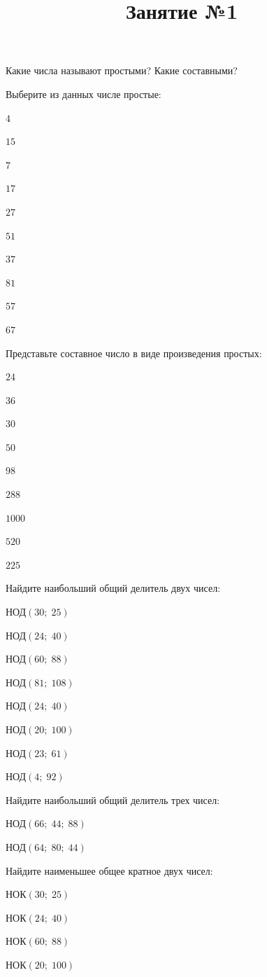 \title{Занятие №1}
\begin{listofex}
	\item Какие числа называют простыми? Какие составными?
	\item Выберите из данных числе простые:
	\begin{enumcols}[itemcolumns=10]
		\item \( 4 \)
		\item \( 15 \)
		\item \( 7 \)
		\item \( 17 \)
		\item \( 27 \)
		\item \( 51 \)
		\item \( 37 \)
		\item \( 81 \)
		\item \( 57 \)
		\item \( 67 \)
	\end{enumcols}
	\item Представьте составное число в виде произведения простых:
	\begin{enumcols}[itemcolumns=3]
		\item \( 24 \)
		\item \( 36 \)
		\item \( 30 \)
		\item \( 50 \)
		\item \( 98 \)
		\item \( 288 \)
		\item \( 1000 \)
		\item \( 520 \)
		\item \( 225 \)
	\end{enumcols}
	\item Найдите наибольший общий делитель двух чисел:
	\begin{enumcols}[itemcolumns=4]
		\item НОД\( (30;\;25) \)
		\item НОД\( (24;\;40) \)
		\item НОД\( (60;\;88) \)
		\item НОД\( (81;\;108) \)
		\item НОД\( (24;\;40) \)
		\item НОД\( (20;\;100) \)
		\item НОД\( (23;\;61) \)
		\item НОД\( (4;\;92) \)
	\end{enumcols}
	\item Найдите наибольший общий делитель трех чисел:
	\begin{enumcols}[itemcolumns=2]
		\item НОД\( (66;\;44;\;88) \)
		\item НОД\( (64;\;80;\;44) \)
	\end{enumcols}
	\item Найдите наименьшее общее кратное двух чисел:
	\begin{enumcols}[itemcolumns=4]
		\item НОК\( (30;\;25) \)
		\item НОК\( (24;\;40) \)
		\item НОК\( (60;\;88) \)
		\item НОК\( (20;\;100) \)
	\end{enumcols}
\end{listofex}

